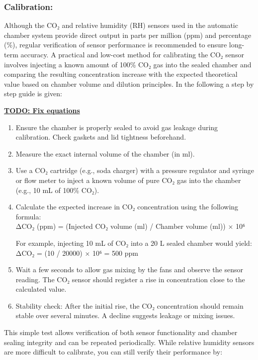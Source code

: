 \documentclass[
  11pt,
  letterpaper,
]{book}
\begin{document}
\subsubsection{Calibration:}\label{sec-mesocosm-flux-calibration}

Although the CO₂ and relative humidity (RH) sensors used in the
automatic chamber system provide direct output in parts per million
(ppm) and percentage (\%), regular verification of sensor performance is
recommended to ensure long-term accuracy. A practical and low-cost
method for calibrating the CO₂ sensor involves injecting a known amount
of 100\% CO₂ gas into the sealed chamber and comparing the resulting
concentration increase with the expected theoretical value based on
chamber volume and dilution principles. In the following a step by step
guide is given:

\ul{\textbf{TODO: Fix equations}}

\begin{enumerate}
\def\labelenumi{\arabic{enumi}.}
\item
  Ensure the chamber is properly sealed to avoid gas leakage during
  calibration. Check gaskets and lid tightness beforehand.
\item
  Measure the exact internal volume of the chamber (in ml).
\item
  Use a CO₂ cartridge (e.g., soda charger) with a pressure regulator and
  syringe or flow meter to inject a known volume of pure CO₂ gas into
  the chamber (e.g., 10 mL of 100\% CO₂).
\item
  Calculate the expected increase in CO₂ concentration using the
  following formula:\\
  ΔCO₂ (ppm) = (Injected CO₂ volume (ml) / Chamber volume (ml)) × 10⁶

  For example, injecting 10 mL of CO₂ into a 20 L sealed chamber would
  yield:\\
  ΔCO₂ = (10 / 20000) × 10⁶ = 500 ppm
\item
  Wait a few seconds to allow gas mixing by the fans and observe the
  sensor reading. The CO₂ sensor should register a rise in concentration
  close to the calculated value.
\item
  Stability check: After the initial rise, the CO₂ concentration should
  remain stable over several minutes. A decline suggests leakage or
  mixing issues.
\end{enumerate}

This simple test allows verification of both sensor functionality and
chamber sealing integrity and can be repeated periodically. While
relative humidity sensors are more difficult to calibrate, you can still
verify their performance by:
\end{document}
